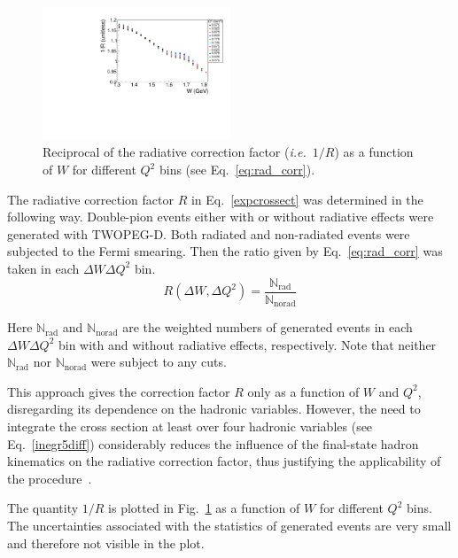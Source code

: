 \documentclass[prc,twocolumn,superscriptaddress,showpacs,amssymb,amsmath,amsfonts,aps,nofootinbib]{revtex4-1}
\begin{document}
\begin{figure}[htp]
\begin{center}
\includegraphics[width=0.5\textwidth]{pictures/corrections/radcorr.pdf}
\caption{\small Reciprocal of the radiative correction factor ({\it i.e.}~$1/R$) as a function of $W$ for different $Q^{2}$ bins (see Eq.\!~\eqref{eq:rad_corr}).} \label{fig:radcorr}
\end{center}
\end{figure}

The radiative correction factor $R$ in Eq.\!~\eqref{expcrossect} was determined in the following way. Double-pion events either with or without radiative effects were generated with TWOPEG-D. Both radiated and non-radiated events were subjected to the Fermi smearing. Then the ratio given by Eq.\!~\eqref{eq:rad_corr} was taken in each $\Delta W \Delta Q^{2}$ bin.
\begin{equation}
R(\Delta W, \Delta Q^{2}) = \frac{\mathbb{N}_{\text{rad}}}{\mathbb{N}_{\text{norad}}}
\label{eq:rad_corr}
\end{equation}

Here $\mathbb{N}_{\text{rad}}$ and $\mathbb{N}_{\text{norad}}$ are the weighted numbers of generated events in each $\Delta W \Delta Q^{2}$ bin with and without radiative effects, respectively. Note that neither $\mathbb{N}_{\text{rad}}$ nor $\mathbb{N}_{\text{norad}}$ were subject to any cuts.


This approach gives the correction factor $R$ only as a function of $W$ and $Q^{2}$, disregarding its dependence on the hadronic variables. However, the need to integrate the cross section at least over four hadronic variables (see Eq.\!~\eqref{inegr5diff}) considerably reduces the influence of the final-state hadron kinematics on the radiative correction factor, thus justifying the applicability of the procedure~\cite{Mo:1968cg,twopeg,twopeg-d}.

The quantity $1/R$ is plotted in Fig.\!~\ref{fig:radcorr} as a function of $W$ for different $Q^{2}$ bins. The uncertainties associated with the statistics of generated events are very small and therefore not visible in the plot.
\end{document}
